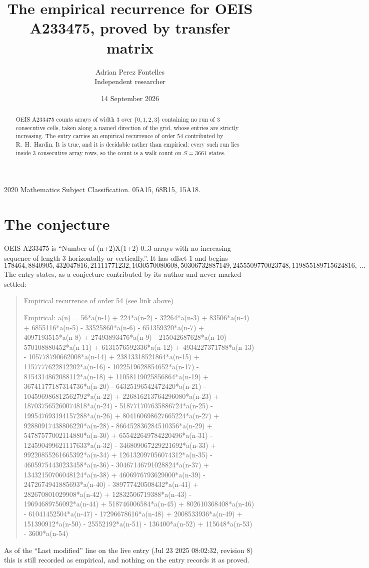\documentclass[11pt,a4paper]{article}
\title{The empirical recurrence for OEIS A233475, proved by transfer matrix}
\author{Adrian Perez Fontelles\\ \small Independent researcher}
\date{14 September 2026}
\theoremstyle{plain}
\theoremstyle{definition}
\begin{document}
\maketitle

\begin{abstract}
OEIS A233475 counts arrays of width $3$ over $\{0,1,2,3\}$ containing no run of $3$ consecutive
cells, taken along a named direction of the grid, whose entries are strictly increasing. The entry carries
an empirical recurrence of order $54$ contributed by R.~H.~Hardin. It is true, and it is
decidable rather than empirical: every such run lies inside $3$ consecutive array rows, so
the count is a walk count on $S=3661$ states.
\end{abstract}

\noindent\small 2020 Mathematics Subject Classification. 05A15, 68R15, 15A18.\normalsize

\section{The conjecture}

OEIS A233475 is ``Number of (n+2)X(1+2) 0..3 arrays with no increasing sequence of length 3 horizontally or vertically.''. It has offset $1$ and begins
\[
178464, 8840905, 432047816, 21111771232, 1030570080608, 50306732887149, 2455509770023748, 119855189715624816,\ \dots
\]
The entry states, as a conjecture contributed by its author and never marked settled:
\begin{quote}
Empirical recurrence of order 54 (see link above)

Empirical: a(n) = 56*a(n-1) + 224*a(n-2) - 32264*a(n-3) + 83506*a(n-4) + 6855116*a(n-5) - 33525860*a(n-6) - 651359320*a(n-7) + 4097193515*a(n-8) + 27493893476*a(n-9) - 215042687628*a(n-10) - 570108880452*a(n-11) + 6131576592336*a(n-12) + 4934227371788*a(n-13) - 105778790662008*a(n-14) + 23813318521864*a(n-15) + 1157777622812202*a(n-16) - 1022519628854652*a(n-17) - 8154314862088112*a(n-18) + 11058119025856864*a(n-19) + 36741177187314736*a(n-20) - 64325196542472420*a(n-21) - 104596986812562792*a(n-22) + 226816213764296080*a(n-23) + 187037565260074818*a(n-24) - 518771707635886724*a(n-25) - 199547693194157288*a(n-26) + 804160698627665224*a(n-27) + 92880917438806220*a(n-28) - 866452836284510356*a(n-29) + 54787577002114880*a(n-30) + 655422649784220496*a(n-31) - 124590499621117633*a(n-32) - 346809067229221692*a(n-33) + 99220855261665392*a(n-34) + 126132097056074312*a(n-35) - 46059754430233458*a(n-36) - 30467146791028824*a(n-37) + 13432150706048124*a(n-38) + 4606976793629000*a(n-39) - 2472674941885693*a(n-40) - 389777420508432*a(n-41) + 282670801029908*a(n-42) + 12832506719388*a(n-43) - 19694689756092*a(n-44) + 518746006584*a(n-45) + 802610368408*a(n-46) - 61041452504*a(n-47) - 17296678616*a(n-48) + 2008533936*a(n-49) + 151390912*a(n-50) - 25552192*a(n-51) - 136400*a(n-52) + 115648*a(n-53) - 3600*a(n-54)
\end{quote}
As of the ``Last modified'' line on the live entry (Jul 23 2025 08:02:32, revision 8) this is still
recorded as empirical, and nothing on the entry records it as proved.
\end{document}
